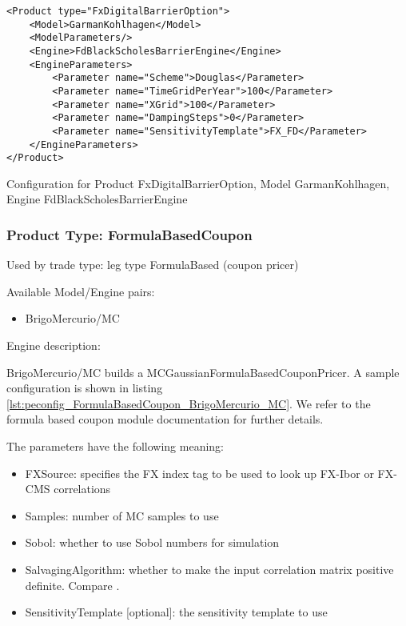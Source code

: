 \begin{longlisting}
\begin{verbatim}
<Product type="FxDigitalBarrierOption">
    <Model>GarmanKohlhagen</Model>
    <ModelParameters/>
    <Engine>FdBlackScholesBarrierEngine</Engine>
    <EngineParameters>
        <Parameter name="Scheme">Douglas</Parameter>
        <Parameter name="TimeGridPerYear">100</Parameter>
        <Parameter name="XGrid">100</Parameter>
        <Parameter name="DampingSteps">0</Parameter>
        <Parameter name="SensitivityTemplate">FX_FD</Parameter>
    </EngineParameters>
</Product>
\end{verbatim}
\caption{Configuration for Product FxDigitalBarrierOption, Model GarmanKohlhagen, Engine FdBlackScholesBarrierEngine}
\label{lst:peconfig_FxDigitalBarrierOption_GarmanKohlhagen_FdBlackScholesBarrierEngine}
\end{longlisting}

\subsubsection{Product Type: FormulaBasedCoupon}

Used by trade type: leg type FormulaBased (coupon pricer)

Available Model/Engine pairs:

\begin{itemize}
\item BrigoMercurio/MC
\end{itemize}

Engine description:

BrigoMercurio/MC builds a MCGaussianFormulaBasedCouponPricer. A sample configuration is shown in listing
\ref{lst:peconfig_FormulaBasedCoupon_BrigoMercurio_MC}. We refer to the formula based coupon module documentation for
further details.

The parameters have the following meaning:

\begin{itemize}
\item FXSource: specifies the FX index tag to be used to look up FX-Ibor or FX-CMS correlations
\item Samples: number of MC samples to use
\item Sobol: whether to use Sobol numbers for simulation
\item SalvagingAlgorithm: whether to make the input correlation matrix positive definite. Compare \cite{corrSalv}.
\item SensitivityTemplate [optional]: the sensitivity template to use 
\end{itemize}

